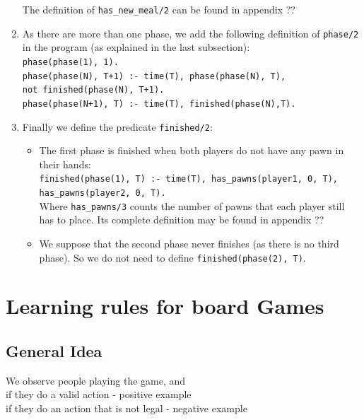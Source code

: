 \documentclass[12pt,twoside]{report}
\begin{document}
\begin{enumerate}
The definition of \texttt{has\_new\_meal/2} can be found in appendix ??

\item As there are more than one phase, we add the following definition of \texttt{phase/2} in the program (as explained in the last subsection):\\
\texttt{phase(phase(1), 1).}\\
\texttt{phase(phase(N), T+1) :- time(T), phase(phase(N), T),\\ not finished(phase(N), T+1).}\\
\texttt{phase(phase(N+1), T) :- time(T), finished(phase(N),T).}

\item Finally we define the predicate \texttt{finished/2}:
\begin{itemize}
\item The first phase is finished when both players do not have any pawn in their hands: \\
\texttt{finished(phase(1), T) :- time(T), has\_pawns(player1, 0, T), \\has\_pawns(player2, 0, T).}\\
Where \texttt{has\_pawns/3} counts the number of pawns that each player still has to place. Its complete definition may be found in appendix ??
\item We suppose that the second phase never finishes (as there is no third phase). So we do not need to define \texttt{finished(phase(2), T)}. 
\end{itemize}

\end{enumerate}




\chapter{Learning rules for board Games}

\section{General Idea}

We observe people playing the game, and \\
if they do a valid action - positive example\\
if they do an action that is not legal - negative example\\
\end{document}
